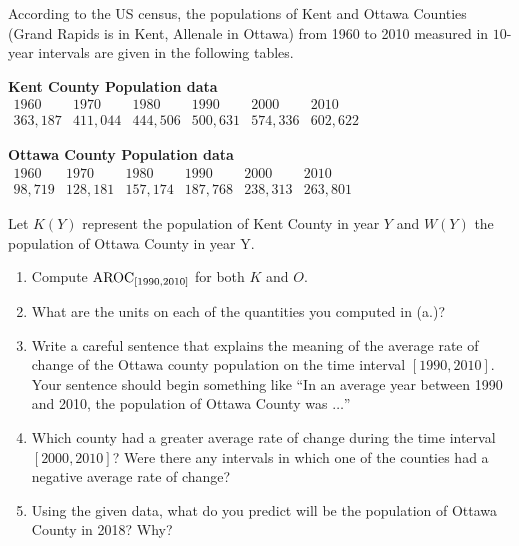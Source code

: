 \documentclass[nooutcomes]{ximera}
\begin{document}
\begin{exploration}
According to the US census, the populations of Kent and Ottawa Counties (Grand Rapids is in Kent, Allenale in Ottawa) from 1960 to 2010 measured in $10$-year intervals are given in the following tables.

\begin{center}

\textbf{Kent County Population data}
$
\begin{array}{llllll}
1960&1970&1980&1990&2000&2010\\
\hline
363,187&411,044&444,506&500,631&574,336&602,622
\end{array}
$

\vspace{.2in}

\textbf{Ottawa County Population data}
$
\begin{array}{llllll}
1960&1970&1980&1990&2000&2010\\
\hline
98,719&128,181&157,174&187,768&238,313&263,801
\end{array}
$
\end{center}

Let $K(Y)$ represent the population of Kent County in year $Y$ and $W(Y)$ the population of Ottawa County in year Y.
\begin{enumerate}[label=\alph*.]
\item Compute $\mathrm{AROC}_{[1990,2010]}$ for both $K$ and $O$.
\item What are the units on each of the quantities you computed in (a.)?
\item Write a careful sentence that explains the meaning of the average rate of change of the Ottawa county population on the time interval $[1990,2010]$.  Your sentence should begin something like ``In an average year between 1990 and 2010, the population of Ottawa County was $\ldots$''
\item Which county had a greater average rate of change during the time interval $[2000,2010]$? Were there any intervals in which one of the counties had a negative average rate of change?
\item Using the given data, what do you predict will be the population of Ottawa County in 2018? Why?
\end{enumerate}
\end{exploration}
\end{document}
